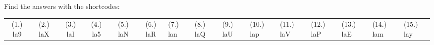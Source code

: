     
  \label{m39414**end}
          
       
    
  \label{fbcda86bdf0258b6e91dcea5caee5b76**end}
    
\par {} Find the answers with the shortcodes:
 \par \begin{tabular}[h]{cccccc}
 (1.) la9  &  (2.) laX  &  (3.) laI  &  (4.) la5  &  (5.) laN  &  (6.) laR  &  (7.) lan  &  (8.) laQ  &  (9.) laU  &  (10.) lap  &  (11.) laV  &  (12.) laP  &  (13.) laE  &  (14.) lam  &  (15.) lay  & \end{tabular}



